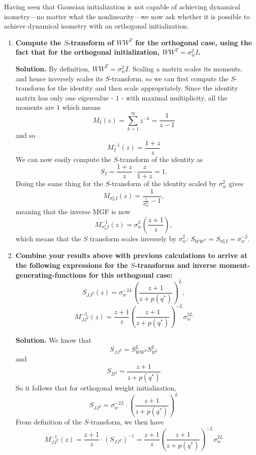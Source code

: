 \documentclass[a4paper]{article}
\begin{document}
Having seen that Gaussian initialization is not capable of achieving dynamical isometry---no matter what the nonlinearity---we now ask whether it is possible to achieve dynamical isometry with an orthogonal initialization.  

\begin{enumerate}[label=(\alph*)]
    \item \textbf{Compute the $S$-transform of $WW^T$ for the orthogonal case, using the fact that for the orthogonal initialization, $WW^T = \sigma_w^2 I$.}
    \begin{tcolorbox}
     \textbf{Solution.} By definition, $WW^T = \sigma_w^2 I$. Scaling a matrix scales its moments, and hence inversely scales its $S$-transform, so we can first compute the $S$-transform for the identity and then scale appropriately. Since the identity matrix has only one eigenvalue - $1$ - with maximal multiplicity, all the moments are $1$ which means
    $$ M_I(z) = \sum_{k = 1}^\infty z^{-k} = \frac{1}{z - 1} $$
    and so
    $$ M_I^{-1}(z) = \frac{1 + z}{z} $$
    We can now easily compute the $S$-transform of the identity as
    $$ S_{I} = \frac{1 + z}{z} \cdot \frac{z}{1 + z} = 1 .$$
    Doing the same thing for the $S$-transform of the identity scaled by $\sigma_w^2$ gives 
    $$M_{\sigma_w^2I}(z) = \frac{1}{\frac{z}{\sigma_w^2}-1},$$
    meaning that the inverse MGF is now
    $$M_{\sigma_w^2I}^{-1}(z) = \sigma_w^2 \left(\frac{z+1}{z}\right),$$
    which means that the $S$ transform scales inversely by $\sigma_w^2$:
    $S_{WW^T} = S_{\sigma_w^2 I} = \sigma_w^{-2}$.
    \end{tcolorbox}

    \item \textbf{Combine your results above with previous calculations to arrive at the following expressions for the $S$-transforms and inverse moment-generating-functions for this orthogonal case:
    \begin{equation}
        S_{JJ^T}(z) = \sigma_w^{-2L}\left(\frac{z+1}{z+p(q^*)}\right)^L,
    \end{equation}
    \begin{equation}
    M_{JJ^T}^{-1}(z) = \frac{z+1}{z}\left(\frac{z+1}{z+p(q^*)}\right)^{-L}\sigma_w^{2L}
    \end{equation}
    }
    \begin{tcolorbox}
     \textbf{Solution.} We know that
    $$ S_{JJ^T} = S_{WW^T}^L S_{D^2}^L $$
    and
    $$ S_{D^2} = \frac{z + 1}{z + p(q^*)} $$
    So it follows that for orthogonal weight initialization,
    $$ S_{JJ^T} = \sigma_w^{-2L} \cdot \left( \frac{z + 1}{z + p(q^*)} \right)^L $$
    From definition of the $S$-transform, we then have
    $$ M_{JJ^T}^{-1}(z) = \frac{z + 1}{z} \cdot (S_{JJ^T})^{-1} = \frac{z + 1}{z} \left( \frac{z + 1}{z + p(q^*)} \right)^{-L} \sigma_w^{2L} $$
    \end{tcolorbox}


\end{enumerate}
\end{document}
